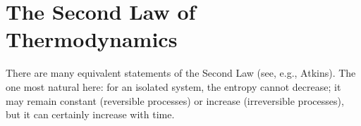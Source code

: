 \chapter{The Second Law of Thermodynamics}

\begin{fact}
There are many equivalent statements of the Second Law (see, e.g., Atkins). The one most natural here: for an isolated system, the entropy cannot decrease; it may remain constant (reversible processes) or increase (irreversible processes), but it can certainly increase with time.
\end{fact}
